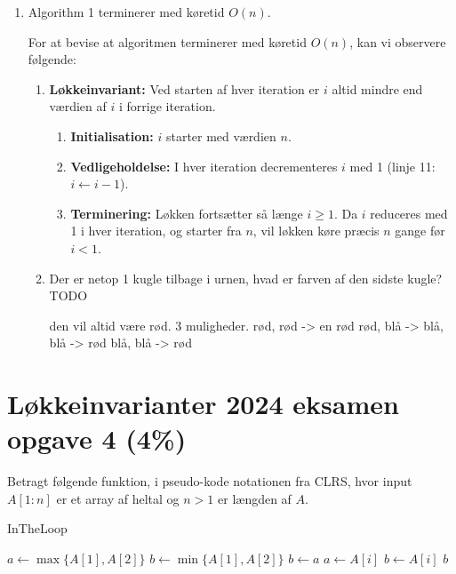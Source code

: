 \documentclass{article}
\theoremstyle{definition}
\begin{document}
\begin{enumerate}
    \item Algorithm 1 terminerer med køretid $O(n)$.
    
    For at bevise at algoritmen terminerer med køretid $O(n)$, kan vi observere følgende:

    \begin{enumerate}
    \item \textbf{Løkkeinvariant:} Ved starten af hver iteration er $i$ altid mindre end værdien af $i$ i forrige iteration.
    
        \begin{enumerate}
            \item \textbf{Initialisation:} $i$ starter med værdien $n$.
            
            \item \textbf{Vedligeholdelse:} I hver iteration decrementeres $i$ med 1 (linje 11: $i \leftarrow i-1$).
            
            \item \textbf{Terminering:} Løkken fortsætter så længe $i \geq 1$. Da $i$ reduceres med 1 i hver iteration, 
            og starter fra $n$, vil løkken køre præcis $n$ gange før $i < 1$.
        \end{enumerate}

    \item Der er netop 1 kugle tilbage i urnen, hvad er farven af den sidste kugle? TODO
    
    den vil altid være rød. 
    3 muligheder.
    rød, rød -> en rød
    rød, blå -> blå, blå -> rød
    blå, blå -> rød
\end{enumerate}

\end{enumerate}

\section{Løkkeinvarianter 2024 eksamen opgave 4 (4\%)}

Betragt følgende funktion, i pseudo-kode notationen fra CLRS, hvor input $A[1:n]$ er et array af heltal og $n > 1$ er længden af $A$.

\begin{algorithm}
\caption{InTheLoop}
\begin{algorithmic}[1]
\State $a \leftarrow \max\{A[1], A[2]\}$
\State $b \leftarrow \min\{A[1], A[2]\}$
        \State $b \leftarrow a$
        \State $a \leftarrow A[i]$
        \State $b \leftarrow A[i]$
    \EndIf
\EndFor
\State \Return $b$
\end{algorithmic}
\end{algorithm}
\end{document}
